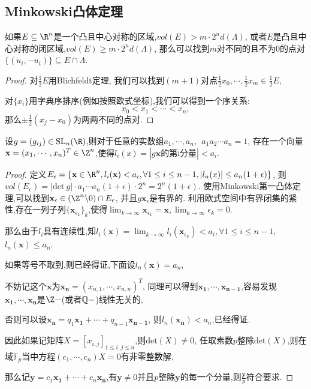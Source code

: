 \subsection{Minkowski凸体定理}
\begin{theorem}[Minkowski第一凸体定理]
    如果$E \subseteq \R^n$是一个凸且中心对称的区域,$vol(E) > m\cdot 2^n d(\Lambda)$,
    或者$E$是凸且中心对称的闭区域,$vol(E) \geq m\cdot 2^n d(\Lambda)$,
    那么可以找到$m$对不同的且不为$0$的点对$\{(u_i,-u_i)\}\subseteq E\cap \Lambda$.
\end{theorem}
\begin{proof}
    对$\frac{1}{2}E$用Blichfeldt定理,
    我们可以找到$(m+1)$对点$\frac12x_0, \cdots, \frac12x_m \in \frac12E$,
    
    对$\{x_i\}$用字典序排序(例如按照欧式坐标),我们可以得到一个序关系:
    $$x_0<x_1<\cdots<x_n,$$
    那么$\pm \frac12(x_j - x_0)$为两两不同的点对.
\end{proof}

\begin{theorem}
设$g = (g_{ij}) \in \mathrm{SL}_n(\R)$,则对于任意的实数组$a_1,\cdots, a_n,\ \ a_1  a_2 \cdots a_n = 1$,
存在一个向量 $\mathbf{x} = (x_1, \cdots, x_n)^T \in \Z^n$,使得$l_i(\mathbb{x}) = |g\mathbf{x}\text{的第i分量}|<a_i$.
\end{theorem}
\begin{proof}
    定义$E_{\epsilon} = \{\mathbf{x}\in \R^n, l_i(\mathbf{x}) < a_i, \forall 1 \leq i \leq n-1, |l_n(x)| \leq a_n(1+\epsilon)\}$,
    则$vol(E_{\epsilon}) = |\mathrm{det} \ g| \cdot a_1 \cdots a_n(1+\epsilon) \cdot 2^n = 2^n(1+\epsilon)$.
    使用Minkowski第一凸体定理,可以找到$\mathbf{x}_{\epsilon} \in (\Z^n \backslash 0) \cap E_{\epsilon}$,
    并且$g\mathbf{x}_{\epsilon}$是有界的.
    利用欧式空间中有界闭集的紧性,存在一列子列$\{\mathbf{x}_{\epsilon_k}\}_k$,使得$\displaystyle \lim_{k\to \infty}\mathbf{x}_{\epsilon_k} = \mathbf{x},\lim_{k\to\infty} \epsilon_k = 0$.

    那么由于$l_i$具有连续性,知$\displaystyle l_i(\mathbf{x}) = \lim_{k\to \infty} l_i(\mathbf{x}_{\epsilon_k}) < a_i,\forall 1 \leq i \leq n-1,$
    $l_n(\mathbf{x}) \leq a_n$.
    
    如果等号不取到,则已经得证,下面设$l_n(\mathbf{x}) = a_n$,

    不妨记这个$\mathbf{x}$为$\mathbf{x_n} = (x_{n,1}, \cdots, x_{n,n})^T$,
    同理可以得到$\mathbf{x_1},\cdots, \mathbf{x_{n-1}}$,容易发现$\mathbf{x_1},\cdots, \mathbf{x_n}$是$\Z-$(或者$\mathbb{Q}-$)线性无关的,

    否则可以设$\mathbf{x_n} = q_1 \mathbf{x_1}+\cdots + q_{n-1}\mathbf{x_{n-1}}$,
    则$l_n(\mathbf{x_n}) < a_n$,已经得证.

    因此如果记矩阵$X = [x_{i,j}]_{1\leq i,j\leq n}$,则$\mathrm{det}(X) \neq 0$,
    任取素数$p $整除$\mathrm{det}(X)$,则在域$\mathbb{F}_p$当中方程$(c_1, \cdots, c_n) X = 0$有非零整数解,

    那么记$\mathbf{y} = c_1 \mathbf{x_1} + \cdots + c_n \mathbf{x_n}$,有$\mathbf{y}\neq 0$并且$p$整除$\mathbf{y}$的每一个分量,则$\frac{\mathbf{y}}{p}$符合要求.

\end{proof}

